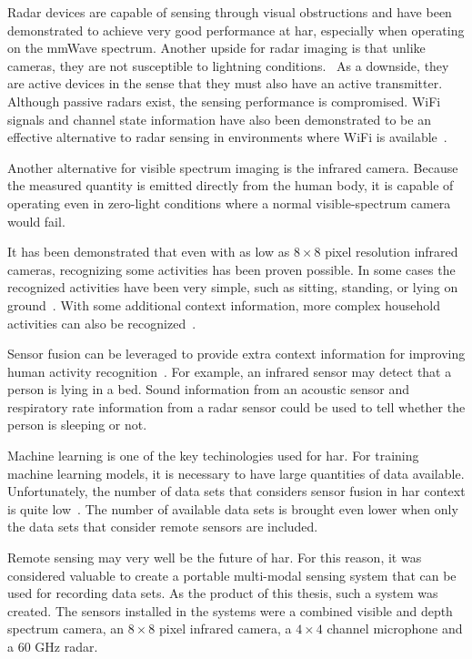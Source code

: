 Radar devices are capable of sensing through visual obstructions
and have been demonstrated to achieve very good performance at \gls{har},
especially when operating on the \gls{mmWave} spectrum.
Another upside for radar imaging is that unlike cameras, 
they are not susceptible to lightning conditions.~\cite{radar-survey}
As a downside, they are active devices in the sense that they must also have an active transmitter.
Although passive radars exist, the sensing performance is compromised.
WiFi signals and channel state information have also been demonstrated to be an effective alternative to radar sensing
in environments where WiFi is available~\cite{sensing-survey}.

Another alternative for visible spectrum imaging is the infrared camera.
Because the measured quantity is emitted directly from the human body,
it is capable of operating even in zero-light conditions where a normal visible-spectrum camera would fail.

It has been demonstrated that even with as low as $8 \times 8$ pixel resolution infrared cameras,
recognizing some activities has been proven possible.
In some cases the recognized activities have been very simple,
such as sitting, standing, or lying on ground~\cite{ir-simple-activities}.
With some additional context information,
more complex household activities can also be recognized~\cite{ir-household}.

Sensor fusion can be leveraged to provide extra context information for improving human activity recognition~\cite{fusion1, fusion2}.
For example, an infrared sensor may detect that a person is lying in a bed.
Sound information from an acoustic sensor and respiratory rate information from a radar sensor
could be used to tell whether the person is sleeping or not.

Machine learning is one of the key techinologies used for \gls{har}.
For training machine learning models, it is necessary to have large quantities of data available.
Unfortunately, the number of data sets that considers sensor fusion in \gls{har} context is quite low~\cite{sensing-survey}.
The number of available data sets is brought even lower when only the data sets that consider remote sensors are included.

Remote sensing may very well be the future of \gls{har}.
For this reason, it was considered valuable to create a portable multi-modal sensing system that can be used for recording data sets.
As the product of this thesis, such a system was created.
The sensors installed in the systems were a combined visible and depth spectrum camera,
an $8 \times 8$ pixel infrared camera, a $4 \times 4$ channel microphone and a 60 GHz radar.

